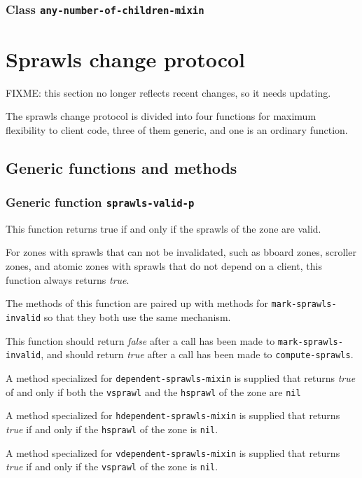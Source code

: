 \documentclass{report}
\begin{document}
\subsubsection{Class \texttt{any-number-of-children-mixin}}


\section{Sprawls change protocol}

FIXME: this section no longer reflects recent changes, so it needs
updating.

The sprawls change protocol is divided into four functions for maximum
flexibility to client code, three of them generic, and one is an
ordinary function.

\subsection{Generic functions and methods}

\subsubsection{Generic function \texttt{sprawls-valid-p}}
\label{generic-function-sprawls-valid-p}

This function returns true if and only if the sprawls of the zone are
valid.  

For zones with sprawls that can not be invalidated, such as bboard
zones, scroller zones, and atomic zones with sprawls that do not depend
on a client, this function always returns \emph{true}.

The methods of this function are paired up with methods for
\texttt{mark-sprawls-invalid} so that they both use the same mechanism. 

This function should return \emph{false} after a call has been made to
\texttt{mark-sprawls-invalid}, and should return \emph{true} after a
call has been made to \texttt{compute-sprawls}.  

A method specialized for \texttt{dependent-sprawls-mixin} is supplied
that returns \emph{true} of and only if both the \texttt{vsprawl} and
the \texttt{hsprawl} of the zone are \texttt{nil}

A method specialized for \texttt{hdependent-sprawls-mixin} is supplied
that returns \emph{true} if and only if the \texttt{hsprawl} of the zone
is \texttt{nil}.

A method specialized for \texttt{vdependent-sprawls-mixin} is supplied
that returns \emph{true} if and only if the \texttt{vsprawl} of the zone
is \texttt{nil}.
\end{document}
